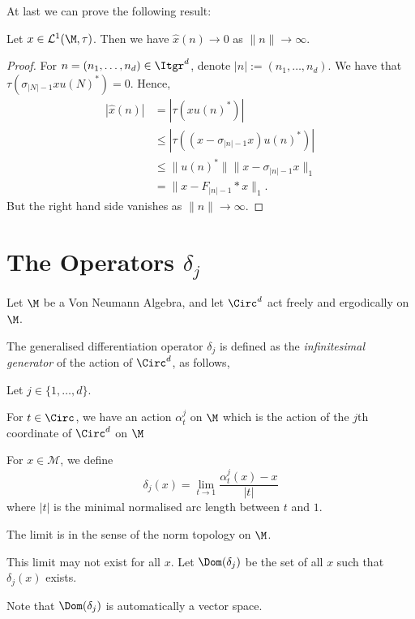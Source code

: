 At last we can prove the following result:
\begin{proposition}
    Let $x \in \mathcal{L}^1(\M,\tau)$. Then we have $\hat{x}(n) \rightarrow 0$
    as $\|n\|\rightarrow\infty$.
\end{proposition}
\begin{proof}
    For $n = (n_1,\ldots,n_d) \in \Itgr^d$, denote $|n| := (n_1,\ldots,n_d)$.
    We have that $\tau(\sigma_{|N|-1}xu(N)^*) = 0$. Hence,
    \begin{align}
        |\hat{x}(n)| &= |\tau(xu(n)^*)|\\
&\leq |\tau((x-\sigma_{|n|-1}x)u(n)^*)|\\
&\leq \|u(n)^*\|\|x-\sigma_{|n|-1}x\|_1\\
&= \|x-F_{|n|-1}*x\|_1.
    \end{align}
    But the right hand side vanishes as $\|n\|\rightarrow\infty$.
\end{proof}

\section{The Operators $\delta_j$}
Let $\M$ be a Von Neumann Algebra, and let $\Circ^d$
act freely and ergodically on $\M$. 

The generalised differentiation operator $\delta_j$ is defined
as the \emph{infinitesimal generator} of the action of $\Circ^d$, as follows,
\begin{definition}
    Let $j \in \{1,\ldots,d\}$. 
    
    For $t \in \Circ$, we have an action $\alpha^j_t$ on $\M$
    which is the action of the $j$th coordinate of $\Circ^d$ on $\M$
    
    For $x \in \mathcal{M}$, we define 
    \begin{equation}
        \delta_j(x) = \lim_{t\rightarrow 1} \frac{\alpha^j_t(x)-x}{|t|}
    \end{equation}
    where $|t|$ is the minimal normalised arc length between $t$ and $1$.
    
    The limit is in the sense of the norm topology on $\M$.
    
    This limit may not exist for all $x$. Let $\Dom(\delta_j)$
    be the set of all $x$ such that $\delta_j(x)$ exists.
\end{definition}
Note that $\Dom(\delta_j)$ is automatically a vector space.




